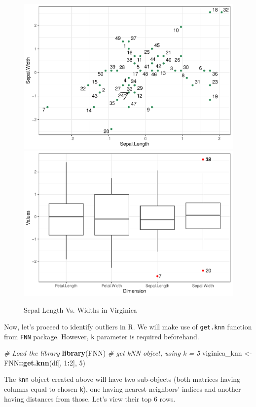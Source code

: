 \documentclass[
]{book}
\newenvironment{Shaded}{\begin{snugshade}}{\end{snugshade}}
\newcommand{\CommentTok}[1]{\textcolor[rgb]{0.56,0.35,0.01}{\textit{#1}}}
\newcommand{\DecValTok}[1]{\textcolor[rgb]{0.00,0.00,0.81}{#1}}
\newcommand{\FunctionTok}[1]{\textcolor[rgb]{0.13,0.29,0.53}{\textbf{#1}}}
\newcommand{\NormalTok}[1]{#1}
\newcommand{\OtherTok}[1]{\textcolor[rgb]{0.56,0.35,0.01}{#1}}
\newcommand{\SpecialCharTok}[1]{\textcolor[rgb]{0.81,0.36,0.00}{\textbf{#1}}}
\begin{document}
\begin{figure}

{\centering \includegraphics[width=0.45\linewidth]{DauR_files/figure-latex/an5-1} \includegraphics[width=0.45\linewidth]{DauR_files/figure-latex/an5-2} 

}

\caption{Sepal Length Vs. Widths in Virginica}\label{fig:an5}
\end{figure}

Now, let's proceed to identify outliers in R. We will make use of \texttt{get.knn} function from \texttt{FNN} package. However, \texttt{k} parameter is required beforehand.

\begin{Shaded}
\begin{Highlighting}[]
\CommentTok{\# Load the library}
\FunctionTok{library}\NormalTok{(FNN)}
\CommentTok{\# get kNN object, using k = 5}
\NormalTok{viginica\_knn }\OtherTok{\textless{}{-}}\NormalTok{ FNN}\SpecialCharTok{::}\FunctionTok{get.knn}\NormalTok{(df[, }\DecValTok{1}\SpecialCharTok{:}\DecValTok{2}\NormalTok{], }\DecValTok{5}\NormalTok{)}
\end{Highlighting}
\end{Shaded}

The \texttt{knn} object created above will have two sub-objects (both matrices having columns equal to chosen \texttt{k}), one having nearest neighbors' indices and another having distances from those. Let's view their top 6 rows.

\begin{Shaded}
\end{Shaded}
\end{document}
